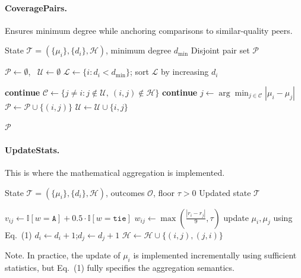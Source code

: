 \paragraph{CoveragePairs.}
Ensures minimum degree while anchoring comparisons to similar-quality peers.
\begin{algorithm}[h]
\caption{\textsc{CoveragePairs}$(\mathcal{T}, d_{\min})$}
\label{alg:coveragepairs}
\begin{algorithmic}[1]
\Require State $\mathcal{T}=(\{\mu_i\},\{d_i\},\mathcal{H})$, minimum degree $d_{\min}$
\Ensure Disjoint pair set $\mathcal{P}$

\State $\mathcal{P}\gets\emptyset$, \ $\mathcal{U}\gets\emptyset$ 
\State $\mathcal{L}\gets\{i : d_i < d_{\min}\}$; sort $\mathcal{L}$ by increasing $d_i$

     \State \textbf{continue} \EndIf
    \State $\mathcal{C}\gets\{j\neq i : j\notin\mathcal{U},\ (i,j)\notin\mathcal{H}\}$
     \State \textbf{continue} \EndIf
    \State $j \gets \arg\min_{j\in\mathcal{C}} |\mu_i-\mu_j|$
    \State $\mathcal{P}\gets\mathcal{P}\cup\{(i,j)\}$
    \State $\mathcal{U}\gets\mathcal{U}\cup\{i,j\}$
\EndFor

\State \Return $\mathcal{P}$
\end{algorithmic}
\end{algorithm}

\paragraph{UpdateStats.}
This is where the mathematical aggregation is implemented.
\begin{algorithm}[h]
\caption{\textsc{UpdateStats}$(\mathcal{T},\mathcal{O},\tau)$}
\label{alg:updatestats}
\begin{algorithmic}[1]
\Require State $\mathcal{T}=(\{\mu_i\},\{d_i\},\mathcal{H})$, outcomes $\mathcal{O}$, floor $\tau>0$
\Ensure Updated state $\mathcal{T}$

    \State $v_{ij}\gets \mathbb{I}[w=\texttt{A}] + 0.5\cdot\mathbb{I}[w=\texttt{tie}]$
    \State $w_{ij}\gets \max\!\left(\frac{|r_i-r_j|}{9},\tau\right)$
    \State update $\mu_i,\mu_j$ using Eq.~(1)
        \State $d_i\gets d_i+1$;\quad $d_j\gets d_j+1$
        \State $\mathcal{H}\gets\mathcal{H}\cup\{(i,j),(j,i)\}$
    \EndIf
\EndFor
\end{algorithmic}
\end{algorithm}
Note. In practice, the update of $\mu_i$ is implemented incrementally using sufficient statistics, but Eq.~(1) fully specifies the aggregation semantics.

